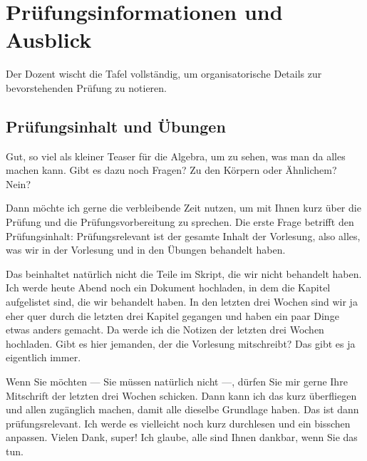 \section{Prüfungsinformationen und Ausblick}

\begin{meta-note}
Der Dozent wischt die Tafel vollständig, um organisatorische Details zur bevorstehenden Prüfung zu notieren.
\end{meta-note}

\subsection{Prüfungsinhalt und Übungen}

\begin{spoken-clean}[01:12:58 - 01:16:29]
Gut, so viel als kleiner Teaser für die Algebra, um zu sehen, was man da alles machen kann. Gibt es dazu noch Fragen? Zu den Körpern oder Ähnlichem? Nein?

Dann möchte ich gerne die verbleibende Zeit nutzen, um mit Ihnen kurz über die Prüfung und die Prüfungsvorbereitung zu sprechen. Die erste Frage betrifft den Prüfungsinhalt: Prüfungsrelevant ist der gesamte Inhalt der Vorlesung, also alles, was wir in der Vorlesung und in den Übungen behandelt haben.
\end{spoken-clean}

\begin{spoken-clean}[01:16:29 - 01:18:37]
Das beinhaltet natürlich nicht die Teile im Skript, die wir nicht behandelt haben. Ich werde heute Abend noch ein Dokument hochladen, in dem die Kapitel aufgelistet sind, die wir behandelt haben. In den letzten drei Wochen sind wir ja eher quer durch die letzten drei Kapitel gegangen und haben ein paar Dinge etwas anders gemacht. Da werde ich die Notizen der letzten drei Wochen hochladen. Gibt es hier jemanden, der die Vorlesung mitschreibt? Das gibt es ja eigentlich immer.

Wenn Sie möchten --- Sie müssen natürlich nicht ---, dürfen Sie mir gerne Ihre Mitschrift der letzten drei Wochen schicken. Dann kann ich das kurz überfliegen und allen zugänglich machen, damit alle dieselbe Grundlage haben. Das ist dann prüfungsrelevant. Ich werde es vielleicht noch kurz durchlesen und ein bisschen anpassen. Vielen Dank, super! Ich glaube, alle sind Ihnen dankbar, wenn Sie das tun.
\end{spoken-clean}

